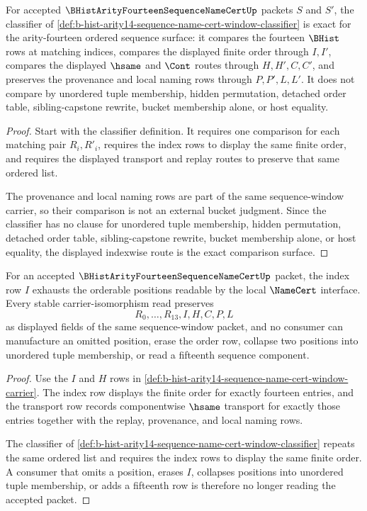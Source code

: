 \begin{theorem}
\label{thm:b-hist-arity14-sequence-name-cert-classifier-exactness}
For accepted $\BHistArityFourteenSequenceNameCertUp$ packets $S$ and $S'$, the classifier of \autoref{def:b-hist-arity14-sequence-name-cert-window-classifier} is exact for the arity-fourteen ordered sequence surface: it compares the fourteen $\BHist$ rows at matching indices, compares the displayed finite order through $I,I'$, compares the displayed $\hsame$ and $\Cont$ routes through $H,H',C,C'$, and preserves the provenance and local naming rows through $P,P',L,L'$. It does not compare by unordered tuple membership, hidden permutation, detached order table, sibling-capstone rewrite, bucket membership alone, or host equality.
\end{theorem}
\begin{proof}
Start with the classifier definition. It requires one comparison for each matching pair $R_i,R'_i$, requires the index rows to display the same finite order, and requires the displayed transport and replay routes to preserve that same ordered list.

The provenance and local naming rows are part of the same sequence-window carrier, so their comparison is not an external bucket judgment. Since the classifier has no clause for unordered tuple membership, hidden permutation, detached order table, sibling-capstone rewrite, bucket membership alone, or host equality, the displayed indexwise route is the exact comparison surface.
\end{proof}

\begin{theorem}
\label{thm:b-hist-arity14-sequence-name-cert-index-exhaustion}
For an accepted $\BHistArityFourteenSequenceNameCertUp$ packet, the index row $I$ exhausts the orderable positions readable by the local $\NameCert$ interface. Every stable carrier-isomorphism read preserves
$$
R_0,\ldots,R_{13},I,H,C,P,L
$$
as displayed fields of the same sequence-window packet, and no consumer can manufacture an omitted position, erase the order row, collapse two positions into unordered tuple membership, or read a fifteenth sequence component.
\end{theorem}
\begin{proof}
Use the $I$ and $H$ rows in \autoref{def:b-hist-arity14-sequence-name-cert-window-carrier}. The index row displays the finite order for exactly fourteen entries, and the transport row records componentwise $\hsame$ transport for exactly those entries together with the replay, provenance, and local naming rows.

The classifier of \autoref{def:b-hist-arity14-sequence-name-cert-window-classifier} repeats the same ordered list and requires the index rows to display the same finite order. A consumer that omits a position, erases $I$, collapses positions into unordered tuple membership, or adds a fifteenth row is therefore no longer reading the accepted packet.
\end{proof}

